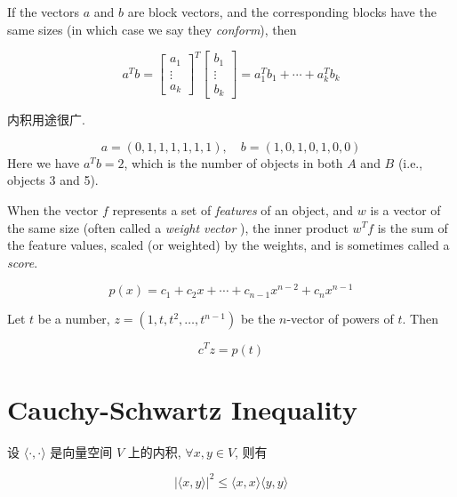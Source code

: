 \begin{definition}
    If the vectors $ a $ and $ b $ are block vectors, and the corresponding blocks have the same sizes (in which case we say they \textit{conform}), then 

    $$ a^{T} b=\left[\begin{array}{c}a_{1} \\ \vdots \\ a_{k}\end{array}\right]^{T}\left[\begin{array}{c}b_{1} \\ \vdots \\ b_{k}\end{array}\right]=a_{1}^{T} b_{1}+\cdots+a_{k}^{T} b_{k} $$
\end{definition}

内积用途很广.

\begin{example}[计算同时出现的项目数]
   $$
a=(0,1,1,1,1,1,1), \quad b=(1,0,1,0,1,0,0)
$$
Here we have $ a^{T} b=2 $, which is the number of objects in both $ A $ and $ B $ (i.e., objects 3 and 5). 
\end{example}

\begin{example}
    When the vector $f$ represents a set of \textit{features} of
    an object, and $w$ is a vector of the same size (often called a \textit{weight vector} ), the
    inner product $w^T f$ is the sum of the feature values, scaled (or weighted) by
    the weights, and is sometimes called a \textit{score}.
\end{example}

\begin{example}
    $$ p(x)=c_{1}+c_{2} x+\cdots+c_{n-1} x^{n-2}+c_{n} x^{n-1} $$

    Let $t$ be a number, $ z=\left(1, t, t^{2}, \ldots, t^{n-1}\right) $  be the $n$-vector of powers
    of $t$. Then

    $$ c^{T} z=p(t) $$
\end{example}


\section{Cauchy-Schwartz Inequality}
\begin{theorem}
    设 \( \langle \cdot,\cdot \rangle \) 是向量空间 \( V \) 上的内积, \( \forall x, y \in V \), 则有

    $$
|\langle x, y\rangle|^{2} \leq\langle x, x\rangle\langle y, y\rangle
$$
\end{theorem}

